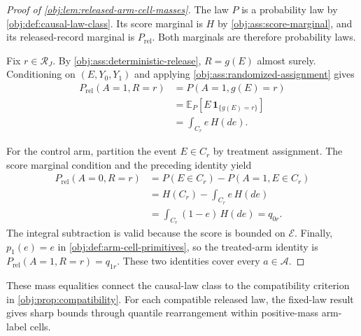 \documentclass[11pt]{article}
\begin{document}
\begin{proof}[Proof of \cref{obj:lem:released-arm-cell-masses}]
The law \(P\) is a probability law by \cref{obj:def:causal-law-class}. Its score marginal is \(H\) by \cref{obj:ass:score-marginal}, and its released-record marginal is \(P_{\mathrm{rel}}\). Both marginals are therefore probability laws. %

Fix \(r\in\mathcal R_J\). By \cref{obj:ass:deterministic-release}, \(R=g(E)\) almost surely. Conditioning on \((E,Y_0,Y_1)\) and applying \cref{obj:ass:randomized-assignment} gives
\[
\begin{aligned}
P_{\mathrm{rel}}(A=1,R=r)
&=P(A=1,g(E)=r)\\
&=\mathbb E_P\!\left[E\,\mathbf 1_{\{g(E)=r\}}\right]\\
&=\int_{C_r}e\,H(de).
\end{aligned}
\] %

For the control arm, partition the event \(E\in C_r\) by treatment assignment. The score marginal condition and the preceding identity yield
\[
\begin{aligned}
P_{\mathrm{rel}}(A=0,R=r)
&=P(E\in C_r)-P(A=1,E\in C_r)\\
&=H(C_r)-\int_{C_r}e\,H(de)\\
&=\int_{C_r}(1-e)\,H(de)
=q_{0r}.
\end{aligned}
\] %
The integral subtraction is valid because the score is bounded on \(\mathcal E\). Finally, \(p_1(e)=e\) in \cref{obj:def:arm-cell-primitives}, so the treated-arm identity is \(P_{\mathrm{rel}}(A=1,R=r)=q_{1r}\). These two identities cover every \(a\in\mathcal A\). %
\end{proof}

These mass equalities connect the causal-law class to the compatibility criterion in \cref{obj:prop:compatibility}. For each compatible released law, the fixed-law result gives sharp bounds through quantile rearrangement within positive-mass arm-label cells.
\end{document}
